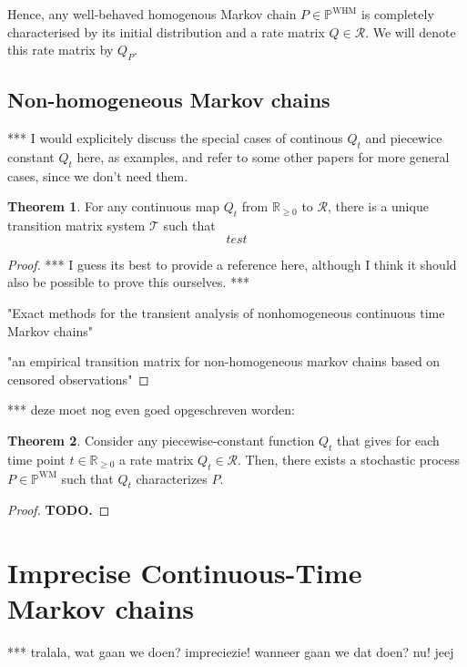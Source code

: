\documentclass[10pt]{paper}
\theoremstyle{definition}
\newtheorem{theorem}{Theorem}
\newcommand{\reals}{\mathbb{R}}
\newcommand{\realsnonneg}{\reals_{\geq 0}}
\newcommand{\processes}{\mathbb{P}}
\newcommand{\wmprocesses}{\processes^{\mathrm{WM}}}
\newcommand{\whmprocesses}{\processes^{\mathrm{WHM}}}
\begin{document}
Hence, any well-behaved homogenous Markov chain $P\in\whmprocesses$ is completely characterised by its initial distribution and a rate matrix $Q\in\mathcal{R}$. We will denote this rate matrix by $Q_P$.

\subsection{Non-homogeneous Markov chains}

*** I would explicitely discuss the special cases of continous $Q_t$ and piecewice constant $Q_t$ here, as examples, and refer to some other papers for more general cases, since we don't need them.

\begin{theorem}%
For any continuous map $Q_t$ from $\reals_{\geq0}$ to $\mathcal{R}$, there is a unique transition matrix system $\mathcal{T}$ such that
\begin{equation*}
test
\end{equation*}
\end{theorem}
\begin{proof}
*** I guess its best to provide a reference here, although I think it should also be possible to prove this ourselves. ***

"Exact methods for the transient analysis of nonhomogeneous continuous time Markov chains"

"an empirical transition matrix for non-homogeneous markov chains based on censored observations"
\end{proof}

*** deze moet nog even goed opgeschreven worden:
\begin{theorem}\label{theorem:continuous_rate_matrix_has_process}
Consider any piecewise-constant function $Q_t$ that gives for each time point $t\in\realsnonneg$ a rate matrix $Q_t\in\mathcal{R}$. Then, there exists a stochastic process $P\in\wmprocesses$ such that $Q_t$ characterizes $P$.
\end{theorem}
\begin{proof}
{\bf TODO.}
\end{proof}

\section{Imprecise Continuous-Time Markov chains}
\label{sec:iCTMC}

*** tralala, wat gaan we doen? impreciezie! wanneer gaan we dat doen? nu! jeej
\end{document}
